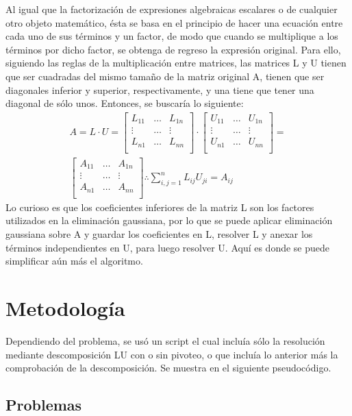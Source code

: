 \documentclass[12pt,oneside,FLEQN]{report}
\begin{document}
{Al igual que la factorización de expresiones algebraicas escalares o de cualquier otro objeto matemático, ésta se basa en el principio de hacer una ecuación entre cada uno de sus términos y un factor, de modo que cuando se multiplique a los términos por dicho factor, se obtenga de regreso la expresión original. Para ello, siguiendo las reglas de la multiplicación entre matrices, las matrices L y U tienen que ser cuadradas del mismo tamaño de la matriz original A, tienen que ser diagonales inferior y superior, respectivamente, y una tiene que tener una diagonal de sólo unos. Entonces, se buscaría lo siguiente:
\begin{align}
	A=L\cdot U=
	\begin{bmatrix}
		L_{11}&\hdots&L_{1n}\\
		\vdots&\hdots&\vdots\\
		L_{n1}&\hdots&L_{nn}\\
	\end{bmatrix}
	\cdot
	\begin{bmatrix}
		U_{11}&\hdots&U_{1n}\\
		\vdots&\hdots&\vdots\\
		U_{n1}&\hdots&U_{nn}\\
	\end{bmatrix}
	=\\
	\begin{bmatrix}
		A_{11}&\hdots&A_{1n}\\
		\vdots&\hdots&\vdots\\
		A_{n1}&\hdots&A_{nn}\\
	\end{bmatrix}\therefore \sum_{i,j=1}^{n}L_{ij}U_{ji}=A_{ij}
\end{align}
Lo curioso es que los coeficientes inferiores de la matriz L son los factores utilizados en la eliminación gaussiana, por lo que se puede aplicar eliminación gaussiana sobre A y guardar los coeficientes en L, resolver L y anexar los términos independientes en U, para luego resolver U. Aquí es donde se puede simplificar aún más el algoritmo.
\chapter{Metodología}
	Dependiendo del problema, se usó un script el cual incluía sólo la resolución mediante descomposición LU con o sin pivoteo, o que incluía lo anterior más la comprobación de la descomposición. Se muestra en el siguiente pseudocódigo.
		
\section{Problemas}
}
\end{document}
